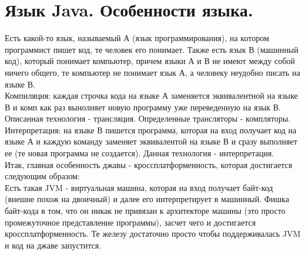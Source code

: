 


\section{Язык Java. Особенности языка.} 
\normalsize{Есть какой-то язык, называемый А (язык программирования), на котором программист пишет код, те человек его понимает. Также есть язык В (машинный код), который понимает компьютер, причем языки А и В не имеют между собой ничего общего, те компьютер не понимает язык А, а человеку неудобно писать на языке В. \\
Компиляция: каждая строчка кода на языке А заменяется эквивалентной на языке В и комп как раз вынолняет новую программу уже переведенную на язык В. Описанная технология - трансляция. Определенные трансляторы - компляторы. \\ 
Интерпретация: на языке В пишется программа, которая на вход получает код на языке А и каждую команду заменяет эквивалентой на языке В и сразу выполняет ее (те новая программа не создается). Данная технология - интерпретация.\\
Итак, главная особенность джавы - кроссплатформенность, которая достигается следующим образом: \\
Есть такая JVM - виртуальная машина, которая на вход получает байт-код (внешне похож на двоичный) и далее его интерпретирует в машинный. Фишка байт-кода в том, что он никак не привязан к архитекторе машины (это просто промежуточное представление программы), засчет чего и достигается кроссплатформенность. Те железу достаточно просто чтобы поддерживалась JVM и код на джаве запустится.} 

